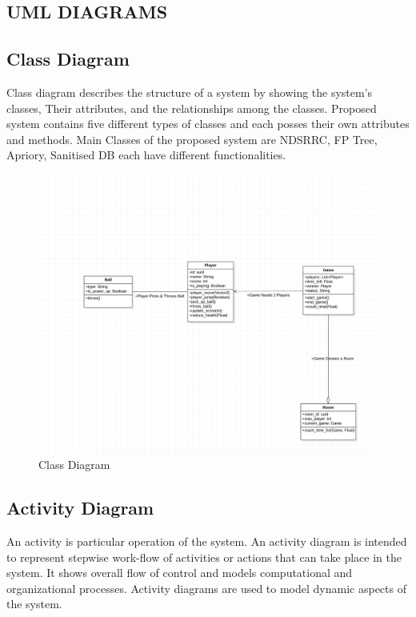 \documentclass[12pt]{report}
\begin{document}
\raggedright
\subsection{UML DIAGRAMS}


\justifying
\setlength{\parindent}{4em}
\setlength{\parskip}{0.5em}
\renewcommand{\baselinestretch}{1.5}
\normalsize
\subsection{ Class Diagram}
Class diagram describes the structure of a system by showing the system’s classes, Their
attributes, and the relationships among the classes. Proposed system contains five different 
types of classes and each posses their own attributes and methods. Main Classes of the 
proposed system are NDSRRC, FP Tree, Apriory, Sanitised DB each have different 
functionalities.


\setlength{\parindent}{0em}
\setlength{\parskip}{0em}
\renewcommand{\baselinestretch}{1.5}
\vspace{0.5cm}
\begin{figure}[h]
\centering
\includegraphics[scale=0.5]{Class.png}
\caption{ Class Diagram}
\label{ Class Diagram}
\end{figure}
\vspace{0.1cm}

\justifying
\setlength{\parindent}{4em}
\setlength{\parskip}{0.5em}
\renewcommand{\baselinestretch}{1.5}
\normalsize
\subsection{Activity Diagram}
An activity is particular operation of the system. An activity diagram is intended to represent
stepwise work-flow of activities or actions that can take place in the system. It shows overall
flow of control and models computational and organizational processes. Activity diagrams
are used to model dynamic aspects of the system. 
\end{document}
